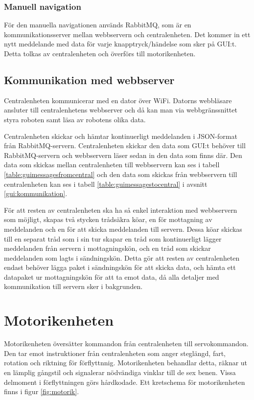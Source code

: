 \documentclass[a4paper,titlepage,12pt]{article}
\begin{document}
    \subsubsection{Manuell navigation}
    För den manuella navigationen används RabbitMQ, som är en kommunikationsserver 
    mellan webbservern
    och centralenheten. Det kommer in ett nytt meddelande med data för varje
    knapptryck/händelse som sker på GUI:t. Detta tolkas av centralenheten och
    överförs till motorikenheten.

	\subsection{Kommunikation med webbserver}
	Centralenheten kommunicerar med en dator över WiFi. Datorns webbläsare 
	ansluter till centralenhetens webbserver och då kan man
	via webbgränssnittet styra roboten samt läsa av robotens olika data. 
		
	Centralenheten skickar och hämtar kontinuerligt meddelanden i JSON-format från
    RabbitMQ-servern. Centralenheten skickar den data som GUI:t
	behöver till RabbitMQ-servern och webbservern läser sedan in den data som finns där.
	Den data som skickas mellan centralenheten till webbservern kan ses i
	tabell \ref{table:guimessagesfromcentral} och den data som skickas från
    webbservern till centralenheten kan ses i tabell
    \ref{table:guimessagestocentral} i avsnitt \ref{gui:kommunikation}.

    För att resten av centralenheten ska ha så enkel interaktion med
    webbservern som möjligt, skapas två stycken trådsäkra köar, en för mottagning av
    meddelanden och en för att skicka meddelanden till servern. Dessa köar
    skickas till en separat tråd som i sin tur skapar en tråd som kontinuerligt
    lägger meddelanden från servern i mottagningskön, och en tråd som skickar
    meddelanden som lagts i sändningskön. Detta gör att resten av
    centralenheten endast behöver lägga paket i sändningskön för att skicka
    data, och hämta ett datapaket ur mottagningskön för att ta emot data, då
    alla detaljer med kommunikation till servern sker i bakgrunden.
    

    \newpage
	\section{Motorikenheten}
	Motorikenheten översätter kommandon från centralenheten till servokommandon. Den tar emot 
	instruktioner från centralenheten som anger steglängd, fart, rotation och riktning för 
	förflyttnnig. Motorikenheten behandlar detta, räknar ut en lämplig gångstil och 
	signalerar nödvändiga vinklar till de sex benen. Vissa delmoment i förflyttningen 
	görs hårdkodade. Ett kretschema för motorikenheten finns i figur \ref{fig:motorik}.
\end{document}
